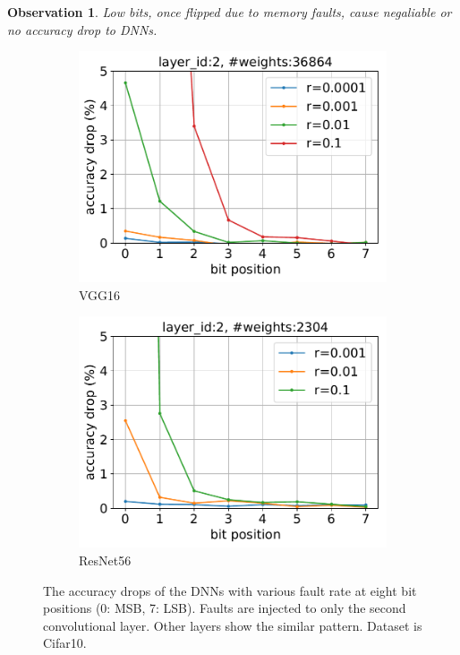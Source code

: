 \documentclass{article}
\newtheorem{observation}{Observation}
\begin{document}
\begin{observation}
Low bits, once flipped due to memory faults, cause negaliable or no accuracy drop to DNNs. 
\end{observation}

\begin{figure}
	\centering
	\begin{subfigure}{.42\textwidth}
		\includegraphics[width=\textwidth]{NeuRIPS2019/images/bit_significance/vgg16_2_int8_bit_significance.pdf}
		\caption{VGG16}
	\end{subfigure}
	\begin{subfigure}{.42\textwidth}
		\includegraphics[width=\textwidth]{NeuRIPS2019/images/bit_significance/resnet56_2_int8_bit_significance.pdf}
		\caption{ResNet56}
	\end{subfigure}
	\caption{The accuracy drops of the DNNs with various fault rate at eight bit positions (0: MSB, 7: LSB). Faults are injected to only the second convolutional layer. Other layers show the similar pattern. Dataset is Cifar10.  }
	\label{fig:bit_significance}
\end{figure}
\end{document}
